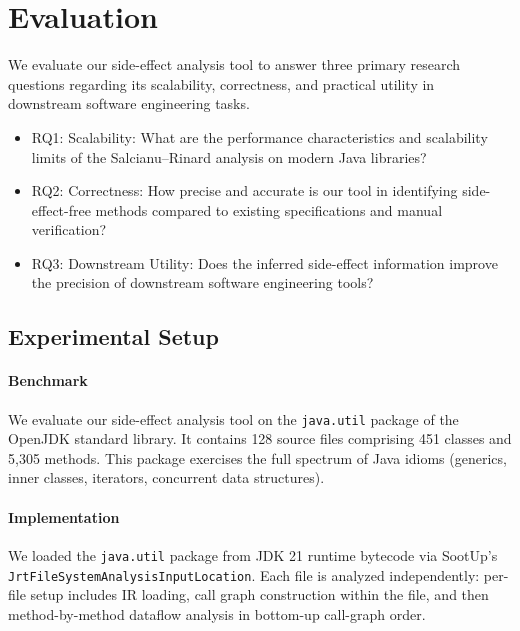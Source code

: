 \section{Evaluation}
We evaluate our side-effect analysis tool to answer three primary research questions regarding its scalability, correctness, and practical utility in downstream software engineering tasks.


\begin{itemize}
    \item RQ1: Scalability: What are the performance characteristics and scalability limits of the Salcianu--Rinard analysis on modern Java libraries?

    \item RQ2: Correctness: How precise and accurate is our tool in identifying side-effect-free methods compared to existing specifications and manual verification?

    \item RQ3: Downstream Utility: Does the inferred side-effect information improve the precision of downstream software engineering tools?
\end{itemize}

\subsection{Experimental Setup}


\paragraph{Benchmark}
We evaluate our side-effect analysis tool on the \texttt{java.util} package of the OpenJDK standard library. It contains 128 source files comprising 451 classes and 5,305 methods.
This package exercises the full spectrum of Java idioms (generics, inner classes, iterators, concurrent data structures). 

\paragraph{Implementation}
We loaded the \texttt{java.util} package from JDK 21 runtime bytecode via SootUp's \newline \texttt{JrtFileSystemAnalysisInputLocation}.
Each file is analyzed independently: per-file setup includes IR loading, call graph construction within the file, and then method-by-method dataflow analysis in bottom-up call-graph order.





